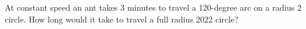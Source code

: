 At constant speed an ant takes 3 minutes to travel a 120-degree arc on a radius 2 circle. How long would it take to travel a full radius 2022 circle?
